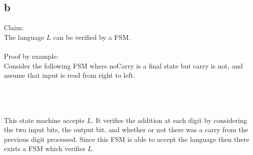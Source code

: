\documentclass[letterpaper,notitlepage,twoside]{article}
\begin{document}
\subsection*{b}
Claim:\\
The language $L$ can be verified by a FSM.\\\\
Proof by example:\\
Consider the following FSM where noCarry is a final state but carry is not, and assume that input is read from right to left.\\\\
\\\\
This state machine accepts $L$. It verifies the addition at each digit by considering the two input bits, the output bit, and whether or not there was a carry from the previous digit processed. Since this FSM is able to accept the language then there exists a FSM which verifies $L$.\\
\end{document}
